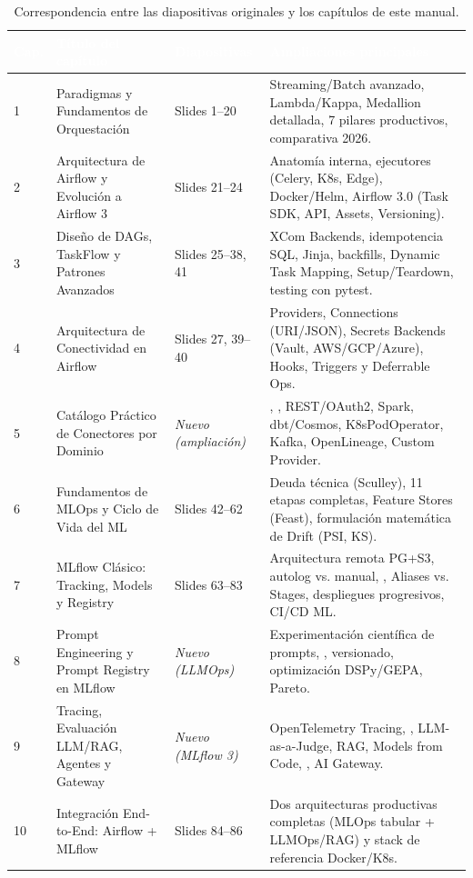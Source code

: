\begin{table}[htbp]
\centering
\caption{Correspondencia entre las diapositivas originales y los capítulos de este manual.}
\label{tab:mapa-slides}
\small
\begin{tabularx}{\textwidth}{@{}C{1.4cm} L{4.6cm} C{2.3cm} Y@{}}
\toprule
{}
\textcolor{white}{\sffamily\bfseries Cap.} &
\textcolor{white}{\sffamily\bfseries Título del capítulo} &
\textcolor{white}{\sffamily\bfseries Diapositivas} &
\textcolor{white}{\sffamily\bfseries Ampliaciones principales} \\
 & Paradigmas y Fundamentos de Orquestación & Slides 1--20 & Streaming/Batch avanzado, Lambda/Kappa, Medallion detallada, 7 pilares productivos, comparativa 2026. \\
2 & Arquitectura de Airflow y Evolución a Airflow 3 & Slides 21--24 & Anatomía interna, ejecutores (Celery, K8s, Edge), Docker/Helm, Airflow 3.0 (Task SDK, API, Assets, Versioning). \\
3 & Diseño de DAGs, TaskFlow y Patrones Avanzados & Slides 25--38, 41 & XCom Backends, idempotencia SQL, Jinja, backfills, Dynamic Task Mapping, Setup/Teardown, testing con pytest. \\
4 & Arquitectura de Conectividad en Airflow & Slides 27, 39--40 & Providers, Connections (URI/JSON), Secrets Backends (Vault, AWS/GCP/Azure), Hooks, Triggers y Deferrable Ops. \\
5 & Catálogo Práctico de Conectores por Dominio & \textit{Nuevo (ampliación)} & , , REST/OAuth2, Spark, dbt/Cosmos, K8sPodOperator, Kafka, OpenLineage, Custom Provider. \\
6 & Fundamentos de MLOps y Ciclo de Vida del ML & Slides 42--62 & Deuda técnica (Sculley), 11 etapas completas, Feature Stores (Feast), formulación matemática de Drift (PSI, KS). \\
7 & MLflow Clásico: Tracking, Models y Registry & Slides 63--83 & Arquitectura remota PG+S3, autolog vs. manual, , Aliases vs. Stages, despliegues progresivos, CI/CD ML. \\
8 & Prompt Engineering y Prompt Registry en MLflow & \textit{Nuevo (LLMOps)} & Experimentación científica de prompts, , versionado, optimización DSPy/GEPA, Pareto. \\
9 & Tracing, Evaluación LLM/RAG, Agentes y Gateway & \textit{Nuevo (MLflow 3)} & OpenTelemetry Tracing, , LLM-as-a-Judge, RAG, Models from Code, , AI Gateway. \\
10 & Integración End-to-End: Airflow + MLflow & Slides 84--86 & Dos arquitecturas productivas completas (MLOps tabular + LLMOps/RAG) y stack de referencia Docker/K8s. \\
\bottomrule
\end{tabularx}
\end{table}

\cleardoublepage
